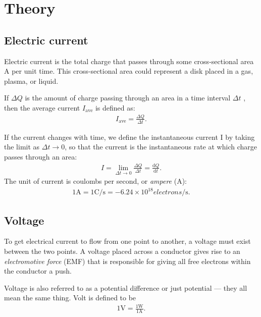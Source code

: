 \documentclass[../../document]{subfiles}
\begin{document}
\graphicspath{{images/}}

\chapter{Theory}
\section{Electric current}
Electric current is the total charge that passes through some cross-sectional
area A per unit time. This cross-sectional area could represent a disk placed
in a gas, plasma, or liquid. \cite{practical_electronics}

If \(\Delta Q\) is the amount of charge passing through an area in a time
interval \(\Delta t\) , then the average current \(I_{\text{ave}}\) is defined as: \cite{practical_electronics}
\begin{gather}
	I_{\text{ave}} = \frac{\Delta Q}{\Delta t}.
\end{gather}

If the current changes with time, we define the instantaneous current I by
taking the limit as \(\Delta t\to 0\), so that the current is the instantaneous
rate at which charge passes through an area: \cite{practical_electronics}
\begin{gather}
	I = \lim_{\Delta t \to 0} \frac{\Delta Q}{\Delta t} = \frac{\mathrm d Q}{\mathrm d t}.
\end{gather}
The unit of current is coulombs per second, or \emph{ampere} (\(\unit{\ampere}\)):
\begin{gather}
	1\unit{\ampere} = 1\unit{\coulomb\per\second} = -6.24\times 10^{18}\unit{electrons\per\second}.
\end{gather}

\section{Voltage}
To get electrical current to flow from one point to another, a voltage must
exist between the two points. A voltage placed across a conductor gives rise to
an \emph{electromotive force} (EMF) that is responsible for giving all free
electrons within the conductor a push. \cite{practical_electronics}

Voltage is also referred to as a potential difference or just potential ---
they all mean the same thing. Volt is defined to be \cite[p. 12]{practical_electronics}
\begin{gather}
	1\unit{\volt} = \frac{1\unit{\watt}}{1\unit{\ampere}}.
\end{gather}
\end{document}
